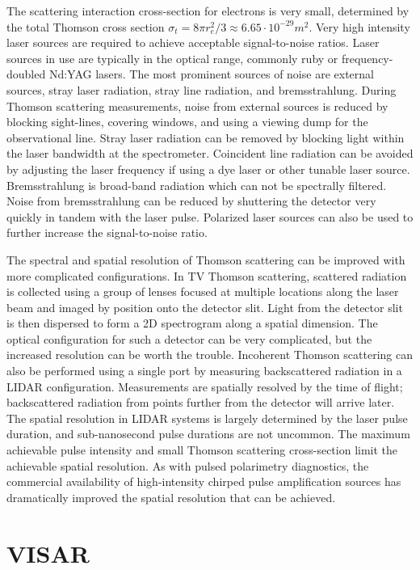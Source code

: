 \documentclass{jpp}
\begin{document}
The scattering interaction cross-section for electrons is very small, determined by the total Thomson cross section $\sigma_t = 8 \pi r_e ^2 / 3 \approx 6.65\cdot 10^{-29} m^2$. Very high intensity laser sources are required to achieve acceptable signal-to-noise ratios. Laser sources in use are typically in the optical range, commonly ruby or frequency-doubled Nd:YAG lasers. The most prominent sources of noise are external sources, stray laser radiation, stray line radiation, and bremsstrahlung. During Thomson scattering measurements, noise from external sources is reduced by blocking sight-lines, covering windows, and using a viewing dump for the observational line. Stray laser radiation can be removed by blocking light within the laser bandwidth at the spectrometer. Coincident line radiation can be avoided by adjusting the laser frequency if using a dye laser or other tunable laser source. Bremsstrahlung is broad-band radiation which can not be spectrally filtered. Noise from bremsstrahlung can be reduced by shuttering the detector very quickly in tandem with the laser pulse. Polarized laser sources can also be used to further increase the signal-to-noise ratio.

The spectral and spatial resolution of Thomson scattering can be improved with more complicated configurations. In TV Thomson scattering, scattered radiation is collected using a group of lenses focused at multiple locations along the laser beam and imaged by position onto the detector slit. Light from the detector slit is then dispersed to form a 2D spectrogram along a spatial dimension. The optical configuration for such a detector can be very complicated, but the increased resolution can be worth the trouble. Incoherent Thomson scattering can also be performed using a single port by measuring backscattered radiation in a LIDAR configuration. Measurements are spatially resolved by the time of flight; backscattered radiation from points further from the detector will arrive later. The spatial resolution in LIDAR systems is largely determined by the laser pulse duration, and sub-nanosecond pulse durations are not uncommon. The maximum achievable pulse intensity and small Thomson scattering cross-section limit the achievable spatial resolution. As with pulsed polarimetry diagnostics, the commercial availability of high-intensity chirped pulse amplification sources has dramatically improved the spatial resolution that can be achieved.

\section{VISAR}
\end{document}

